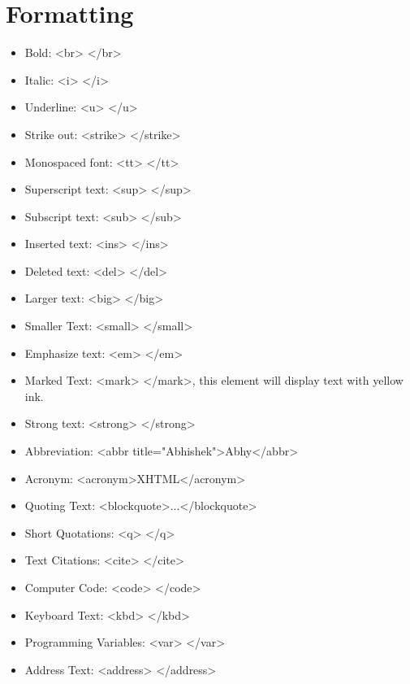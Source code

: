 \documentclass{report}
\begin{document}
    \bigbreak \noindent 
    \section{\LARGE Formatting}
    \bigbreak \noindent 
    \begin{itemize}
        \item Bold: <br> </br>
        \item Italic: <i> </i>
        \item Underline: <u> </u>
        \item Strike out: <strike> </strike>
        \item Monospaced font: <tt> </tt>
        \item Superscript text: <sup> </sup>
        \item Subscript text: <sub> </sub>
        \item Inserted text: <ins> </ins> 
        \item Deleted text: <del> </del>
        \item Larger text: <big> </big>
        \item Smaller Text: <small> </small>
        \item Emphasize text: <em> </em>
        \item Marked Text: <mark> </mark>, this element will display text with yellow ink.
        \item Strong text: <strong> </strong>
        \item Abbreviation: <abbr title="Abhishek">Abhy</abbr>
        \item Acronym: <acronym>XHTML</acronym>
        \item Quoting Text: <blockquote>...</blockquote>
        \item Short Quotations: <q> </q>
        \item Text Citations: <cite> </cite>
        \item Computer Code: <code> </code>
        \item Keyboard Text: <kbd> </kbd>
        \item Programming Variables: <var> </var>
        \item Address Text: <address> </address>
    \end{itemize}

    \pagebreak \bigbreak \noindent 
\end{document}
